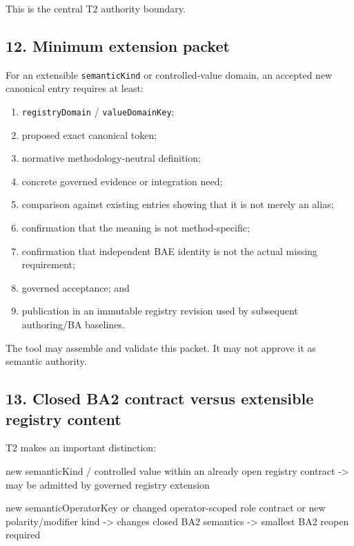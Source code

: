 \documentclass[
  10pt,
  a4paper,
]{article}
\newenvironment{Shaded}{}{}
\newcommand{\NormalTok}[1]{#1}
\providecommand{\tightlist}{%
  \setlength{\itemsep}{0pt}\setlength{\parskip}{0pt}}
\begin{document}
This is the central T2 authority boundary.

\subsection{12. Minimum extension
packet}\label{minimum-extension-packet}

For an extensible \texttt{semanticKind} or controlled-value domain, an
accepted new canonical entry requires at least:

\begin{enumerate}
\def\labelenumi{\arabic{enumi}.}
\tightlist
\item
  \texttt{registryDomain} / \texttt{valueDomainKey};
\item
  proposed exact canonical token;
\item
  normative methodology-neutral definition;
\item
  concrete governed evidence or integration need;
\item
  comparison against existing entries showing that it is not merely an
  alias;
\item
  confirmation that the meaning is not method-specific;
\item
  confirmation that independent BAE identity is not the actual missing
  requirement;
\item
  governed acceptance; and
\item
  publication in an immutable registry revision used by subsequent
  authoring/BA baselines.
\end{enumerate}

The tool may assemble and validate this packet. It may not approve it as
semantic authority.

\subsection{13. Closed BA2 contract versus extensible registry
content}\label{closed-ba2-contract-versus-extensible-registry-content}

T2 makes an important distinction:

\begin{Shaded}
\begin{Highlighting}[]
\NormalTok{new semanticKind / controlled value}
\NormalTok{within an already open registry contract}
\NormalTok{    {-}\textgreater{} may be admitted by governed registry extension}

\NormalTok{new semanticOperatorKey}
\NormalTok{or changed operator{-}scoped role contract}
\NormalTok{or new polarity/modifier kind}
\NormalTok{    {-}\textgreater{} changes closed BA2 semantics}
\NormalTok{    {-}\textgreater{} smallest BA2 reopen required}
\end{Highlighting}
\end{Shaded}
\end{document}

